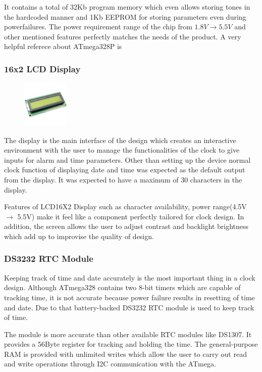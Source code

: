 \documentclass[12pt,twocolumn]{article}
\begin{document}
It contains a total of 32Kb program memory which even allows storing tones in the hardcoded manner and
1Kb EEPROM for storing parameters even during powerfailures. The power requirement range of the chip 
from $1.8V\to5.5V$ and other mentioned features perfectly matches the needs of the product. 
A very helpful referece about ATmega328P is~\cite{widadi2020atmega328p}  

        \subsubsection{16x2 LCD Display}
        
\begin{figure}
    \includegraphics[width=0.2\textwidth]{display}
\end{figure}


The display is the main interface of the design which creates an interactive environment with the 
user to manage the functionalities of the clock to give inputs for alarm and time parameters.
Other than setting up the device normal clock function of displaying date and time was expected
as the default output from the display. It was expected to have a maximum of 30 characters in the
display.

Features of LCD16X2 Display such as character availability, power range(4.5V $\to$ 5.5V) 
make it feel like a component perfectly tailored for clock design. In addition, the screen allows
the user to adjust contrast and backlight brightness which add up to improvise the quality of design.


        \subsubsection{DS3232 RTC Module}
Keeping track of time and date accurately is the most important thing in a clock design. Although 
ATmega328 contains two 8-bit timers which are capable of tracking time, it is not accurate because 
power failure results in resetting of time and date. Due to that battery-backed DS3232 RTC module is 
used to keep track of time.

The module is more accurate than other available RTC modules like DS1307. It provides a 56Byte 
register for tracking and holding the time. The general-purpose RAM is provided with unlimited writes 
which allow the user to carry out read and write operations through I2C communication with the ATmega. 
\end{document}
